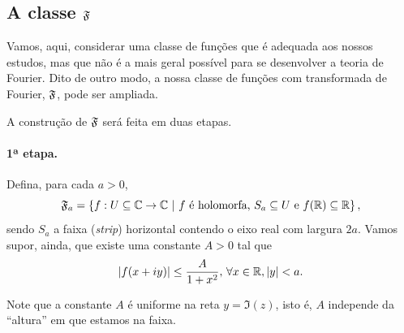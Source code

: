     \subsection{A classe \texorpdfstring{$\mathfrak{F}$}{F}}
        Vamos, aqui, considerar uma classe de funções que é adequada aos nossos estudos, mas
        que não é a mais geral possível para se desenvolver a teoria de Fourier. Dito de outro
        modo, a nossa classe de funções com transformada de Fourier, $\mathfrak{F}$, pode ser
        ampliada.
        
        A construção de $\mathfrak{F}$ será feita em duas etapas.
        
        \paragraph{1ª etapa.} Defina, para cada $a>0$,
        \begin{equation*}
            \F_a = \left\{ f:U\subseteq\C\to\C \ | \ 
            f \text{ é holomorfa, } S_a\subseteq U \text{ e } f(\R)\subseteq\R \right\},
        \end{equation*}
        sendo $S_a$ a faixa (\textit{strip}) horizontal contendo o eixo real com largura $2a$. Vamos supor, ainda,
        que existe uma constante $A>0$ tal que
        \begin{equation*}
            |f(x+iy)| \leq \frac{A}{1 + x^2}, \, \forall x\in\mathbb{R}, |y|<a.
        \end{equation*}
        \begin{figure}[H]
				\centering 
			\end{figure}
        Note que a constante $A$ é uniforme na reta $y = \Im(z)$, isto é, $A$ independe da 
        ``altura'' em que estamos na faixa.
        
